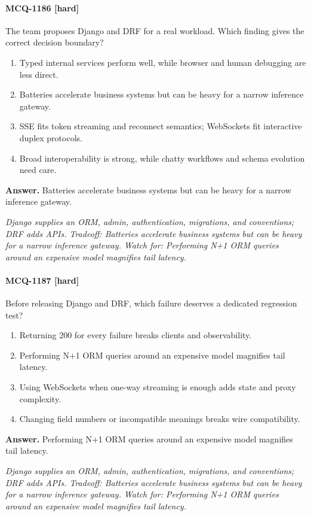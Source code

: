 \paragraph{MCQ-1186 [hard]} The team proposes Django and DRF for a real workload. Which finding gives the correct decision boundary?
\begin{enumerate}[label=\Alph*.]
\item Typed internal services perform well, while browser and human debugging are less direct.
\item Batteries accelerate business systems but can be heavy for a narrow inference gateway.
\item SSE fits token streaming and reconnect semantics; WebSockets fit interactive duplex protocols.
\item Broad interoperability is strong, while chatty workflows and schema evolution need care.
\end{enumerate}
\noindent\textbf{Answer.} Batteries accelerate business systems but can be heavy for a narrow inference gateway.
\par\textit{Django supplies an ORM, admin, authentication, migrations, and conventions; DRF adds APIs. Tradeoff: Batteries accelerate business systems but can be heavy for a narrow inference gateway. Watch for: Performing N+1 ORM queries around an expensive model magnifies tail latency.}
\paragraph{MCQ-1187 [hard]} Before releasing Django and DRF, which failure deserves a dedicated regression test?
\begin{enumerate}[label=\Alph*.]
\item Returning 200 for every failure breaks clients and observability.
\item Performing N+1 ORM queries around an expensive model magnifies tail latency.
\item Using WebSockets when one-way streaming is enough adds state and proxy complexity.
\item Changing field numbers or incompatible meanings breaks wire compatibility.
\end{enumerate}
\noindent\textbf{Answer.} Performing N+1 ORM queries around an expensive model magnifies tail latency.
\par\textit{Django supplies an ORM, admin, authentication, migrations, and conventions; DRF adds APIs. Tradeoff: Batteries accelerate business systems but can be heavy for a narrow inference gateway. Watch for: Performing N+1 ORM queries around an expensive model magnifies tail latency.}
